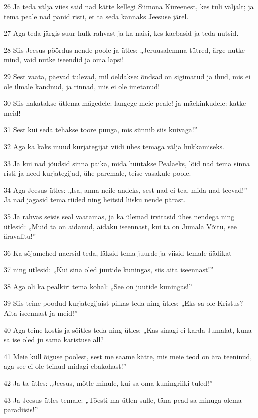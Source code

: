 \par 26 Ja teda välja viies said nad kätte kellegi Siimona Küreenest, kes tuli väljalt; ja tema peale nad panid risti, et ta seda kannaks Jeesuse järel.
\par 27 Aga teda järgis suur hulk rahvast ja ka naisi, kes kaebasid ja teda nutsid.
\par 28 Siis Jeesus pöördus nende poole ja ütles: „Jeruusalemma tütred, ärge nutke mind, vaid nutke iseendid ja oma lapsi!
\par 29 Sest vaata, päevad tulevad, mil öeldakse: õndsad on sigimatud ja ihud, mis ei ole ilmale kandnud, ja rinnad, mis ei ole imetanud!
\par 30 Siis hakatakse ütlema mägedele: langege meie peale! ja mäekinkudele: katke meid!
\par 31 Sest kui seda tehakse toore puuga, mis sünnib siis kuivaga!”
\par 32 Aga ka kaks muud kurjategijat viidi ühes temaga välja hukkamiseks.
\par 33 Ja kui nad jõudsid sinna paika, mida hüütakse Pealaeks, lõid nad tema sinna risti ja need kurjategijad, ühe paremale, teise vasakule poole.
\par 34 Aga Jeesus ütles: „Isa, anna neile andeks, sest nad ei tea, mida nad teevad!” Ja nad jagasid tema riided ning heitsid liisku nende pärast.
\par 35 Ja rahvas seisis seal vaatamas, ja ka ülemad irvitasid ühes nendega ning ütlesid: „Muid ta on aidanud, aidaku iseennast, kui ta on Jumala Võitu, see äravalitu!”
\par 36 Ka sõjamehed naersid teda, läksid tema juurde ja viisid temale äädikat
\par 37 ning ütlesid: „Kui sina oled juutide kuningas, siis aita iseennast!”
\par 38 Aga oli ka pealkiri tema kohal: „See on juutide kuningas!”
\par 39 Siis teine poodud kurjategijaist pilkas teda ning ütles: „Eks sa ole Kristus? Aita iseennast ja meid!”
\par 40 Aga teine kostis ja sõitles teda ning ütles: „Kas sinagi ei karda Jumalat, kuna sa ise oled ju sama karistuse all?
\par 41 Meie küll õiguse poolest, sest me saame kätte, mis meie teod on ära teeninud, aga see ei ole teinud midagi ebakohast!”
\par 42 Ja ta ütles: „Jeesus, mõtle minule, kui sa oma kuningriiki tuled!”
\par 43 Ja Jeesus ütles temale: „Tõesti ma ütlen sulle, täna pead sa minuga olema paradiisis!”


